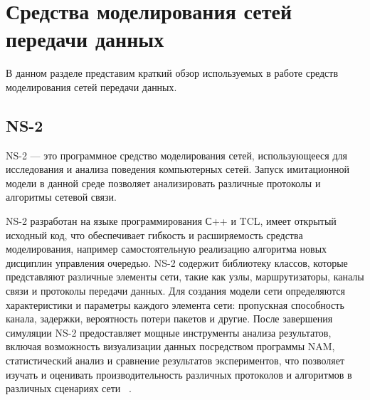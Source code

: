 
\chapter{Средства моделирования сетей передачи данных}
\label{chap1}

В данном разделе представим краткий обзор используемых в работе средств моделирования сетей
передачи данных.

\section{NS-2}
\label{chap1:sec1}

NS-2 — это программное средство моделирования
сетей, использующееся для исследования и анализа поведения
компьютерных сетей.  Запуск имитационной модели в данной среде
позволяет анализировать различные протоколы и алгоритмы сетевой связи.

NS-2 разработан на языке программирования С++ и TCL, имеет открытый исходный код, что обеспечивает
гибкость и расширяемость средства моделирования, например самостоятельную реализацию алгоритма новых дисциплин управления очередью. 
NS-2 содержит библиотеку классов, которые представляют различные элементы сети,
такие как узлы, маршрутизаторы, каналы связи и протоколы передачи
данных. Для создания модели сети определяются характеристики и
параметры каждого элемента сети: пропускная способность канала,
задержки, вероятность потери пакетов и другие. После завершения
симуляции NS-2 предоставляет мощные инструменты анализа результатов,
включая возможность визуализации данных посредством программы NAM, статистический анализ и сравнение результатов
экспериментов, что позволяет изучать и оценивать производительность
различных протоколов и алгоритмов в различных сценариях
сети ~\cite{NS2-1, NS2-2}.

